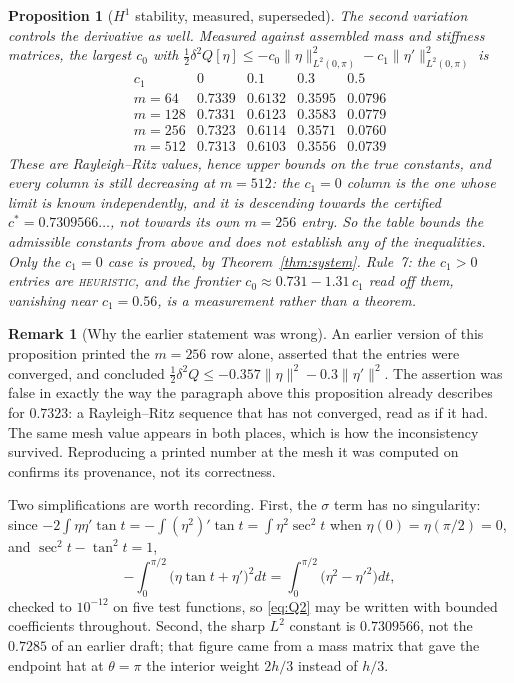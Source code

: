 \documentclass[11pt]{article}
\newtheorem{proposition}[theorem]{Proposition}
\theoremstyle{definition}
\newtheorem{remark}[theorem]{Remark}
\begin{document}
\begin{proposition}[$H^1$ stability, measured, superseded]\label{prop:h1}
The second variation controls the derivative as well. Measured against assembled mass and
stiffness matrices, the largest $c_0$ with
$\tfrac12\delta^2Q[\eta]\le-c_0\|\eta\|^2_{L^2(0,\pi)}-c_1\|\eta'\|^2_{L^2(0,\pi)}$ is
\[
  \begin{array}{r|cccc}
    c_1 & 0 & 0.1 & 0.3 & 0.5\\\hline
    m=64  & 0.7339 & 0.6132 & 0.3595 & 0.0796\\
    m=128 & 0.7331 & 0.6123 & 0.3583 & 0.0779\\
    m=256 & 0.7323 & 0.6114 & 0.3571 & 0.0760\\
    m=512 & 0.7313 & 0.6103 & 0.3556 & 0.0739
  \end{array}
\]
These are Rayleigh--Ritz values, hence upper bounds on the true constants, and every
column is still decreasing at $m=512$: the $c_1=0$ column is the one whose limit is known
independently, and it is descending towards the certified $c^\ast=0.7309566\ldots$, not
towards its own $m=256$ entry. So the table bounds the admissible constants from above and
does \emph{not} establish any of the inequalities. Only the $c_1=0$ case is proved, by
Theorem~\ref{thm:system}. Rule~7: the $c_1>0$ entries are \textsc{heuristic}, and the
frontier $c_0\approx0.731-1.31\,c_1$ read off them, vanishing near $c_1=0.56$, is a
measurement rather than a theorem.
\end{proposition}

\begin{remark}[Why the earlier statement was wrong]\label{rem:h1wrong}
An earlier version of this proposition printed the $m=256$ row alone, asserted that the
entries were converged, and concluded
$\tfrac12\delta^2Q\le-0.357\|\eta\|^2-0.3\|\eta'\|^2$. The assertion was false in exactly
the way the paragraph above this proposition already describes for $0.7323$: a
Rayleigh--Ritz sequence that has not converged, read as if it had. The same mesh value
appears in both places, which is how the inconsistency survived. Reproducing a printed
number at the mesh it was computed on confirms its provenance, not its correctness.
\end{remark}

Two simplifications are worth recording. First, the $\sigma$ term has no singularity:
since $-2\int\eta\eta'\tan t=-\int(\eta^2)'\tan t=\int\eta^2\sec^2t$ when
$\eta(0)=\eta(\pi/2)=0$, and $\sec^2t-\tan^2t=1$,
\[
  -\int_0^{\pi/2}\bigl(\eta\tan t+\eta'\bigr)^2dt
  =\int_0^{\pi/2}\bigl(\eta^2-\eta'^2\bigr)dt ,
\]
checked to $10^{-12}$ on five test functions, so \eqref{eq:Q2} may be written with bounded
coefficients throughout. Second, the sharp $L^2$ constant is $0.7309566$, not the $0.7285$ of
an earlier draft; that figure came from a mass matrix that gave the endpoint hat at
$\theta=\pi$ the interior weight $2h/3$ instead of $h/3$.
\end{document}
